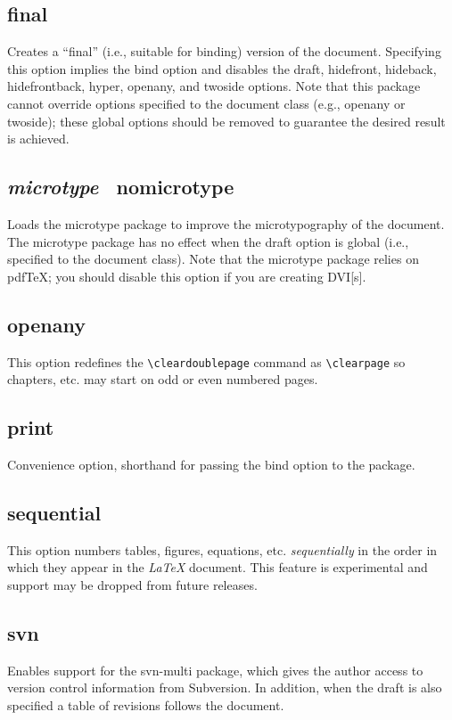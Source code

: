\documentclass[10pt]{article}
\newcommand{\package}[1]{#1}
\newcommand{\option}[1]{#1}
\newcommand{\default}[1]{\emph{#1}}
\begin{document}
\subsection{\option{final}}
Creates a ``final'' (i.e., suitable for binding) version of the document.
Specifying this option implies the \option{bind} option and disables the \option{draft}, \option{hidefront}, \option{hideback}, \option{hidefrontback}, \option{hyper}, \option{openany}, and \option{twoside} options.
Note that this package cannot override options specified to the document class (e.g., \option{openany} or \option{twoside}); these global options should be removed to guarantee the desired result is achieved.

\subsection{\default{\option{microtype}} \textbar\ \option{nomicrotype}}
Loads the \package{microtype} package to improve the microtypography of the document.
The \package{microtype} package has no effect when the \option{draft} option is global (i.e., specified to the document class).
Note that the \package{microtype} package relies on pdf\TeX; you should disable this option if you are creating \gls{DVI}[s].

\subsection{\option{openany}}
This option redefines the \texttt{\textbackslash cleardoublepage} command as \texttt{\textbackslash clearpage} so chapters, etc. may start on odd or even numbered pages.

\subsection{\option{print}}
Convenience option, shorthand for passing the \option{bind} option to the package.

\subsection{\option{sequential}}
This option numbers tables, figures, equations, etc. \emph{sequentially} in the order in which they appear in the \emph{\LaTeX} document.
This feature is experimental and support may be dropped from future releases.

\subsection{\option{svn}}
Enables support for the \package{svn-multi} package, which gives the author access to version control information from Subversion.
In addition, when the \option{draft} is also specified a table of revisions follows the document.
\end{document}
